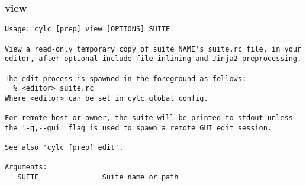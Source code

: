 \subsubsection{view}
\label{view}
\begin{lstlisting}
Usage: cylc [prep] view [OPTIONS] SUITE 

View a read-only temporary copy of suite NAME's suite.rc file, in your
editor, after optional include-file inlining and Jinja2 preprocessing.

The edit process is spawned in the foreground as follows:
  % <editor> suite.rc
Where <editor> can be set in cylc global config.

For remote host or owner, the suite will be printed to stdout unless
the '-g,--gui' flag is used to spawn a remote GUI edit session.

See also 'cylc [prep] edit'.

Arguments:
   SUITE               Suite name or path


\end{lstlisting}
